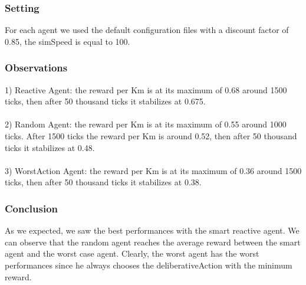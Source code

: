 \documentclass[11pt]{article}
\begin{document}
\subsubsection{Setting}
For each agent we used the default configuration files with a discount factor of 0.85, the simSpeed is equal to 100.

\subsubsection{Observations}

1) Reactive Agent: the reward per Km is at its maximum of 0.68 around 1500 ticks, then after 50 thousand ticks it stabilizes at 0.675.
\\
\\
2) Random Agent: the reward per Km is at its maximum of 0.55 around 1000 ticks. After 1500 ticks the reward per Km is around 0.52, then after 50 thousand ticks it stabilizes at 0.48.
\\
\\
3) WorstAction Agent: the reward per Km is at its maximum of 0.36 around 1500 ticks, then after 50 thousand ticks it stabilizes at 0.38.

\subsubsection{Conclusion}
As we expected, we saw the best performances with the smart reactive agent. We can observe that the random agent reaches the average reward between the smart agent and the worst case agent. Clearly, the worst agent has the worst performances since he always chooses the deliberativeAction with the minimum reward.
\end{document}
